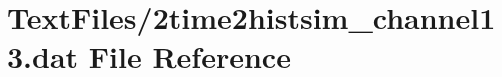 \hypertarget{2time2histsim__channel13_8dat}{}\section{Text\+Files/2time2histsim\+\_\+channel13.dat File Reference}
\label{2time2histsim__channel13_8dat}
